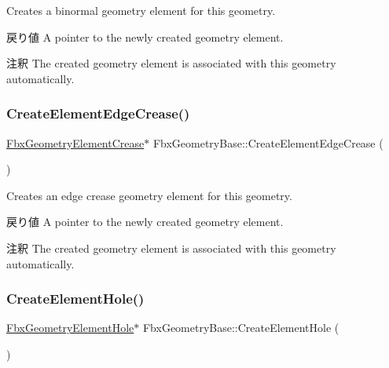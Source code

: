 Creates a binormal geometry element for this geometry. \begin{DoxyReturn}{戻り値}
A pointer to the newly created geometry element. 
\end{DoxyReturn}
\begin{DoxyRemark}{注釈}
The created geometry element is associated with this geometry automatically. 
\end{DoxyRemark}
\mbox{\label{class_fbx_geometry_base_ae5475b4e64c7fa7a9c3c1edd3365d53f}} 
\subsubsection{\texorpdfstring{Create\+Element\+Edge\+Crease()}{CreateElementEdgeCrease()}}
{\footnotesize\ttfamily \hyperlink{fbxlayer_8h_aa1db71d39153856548f192cf52aa2cc5}{Fbx\+Geometry\+Element\+Crease}$\ast$ Fbx\+Geometry\+Base\+::\+Create\+Element\+Edge\+Crease (\begin{DoxyParamCaption}{ }\end{DoxyParamCaption})}

Creates an edge crease geometry element for this geometry. \begin{DoxyReturn}{戻り値}
A pointer to the newly created geometry element. 
\end{DoxyReturn}
\begin{DoxyRemark}{注釈}
The created geometry element is associated with this geometry automatically. 
\end{DoxyRemark}
\mbox{\label{class_fbx_geometry_base_a2c30734fb6ff6bb93adadd35978fc146}} 
\subsubsection{\texorpdfstring{Create\+Element\+Hole()}{CreateElementHole()}}
{\footnotesize\ttfamily \hyperlink{fbxlayer_8h_ac66f768aa149c016447f88213c374e25}{Fbx\+Geometry\+Element\+Hole}$\ast$ Fbx\+Geometry\+Base\+::\+Create\+Element\+Hole (\begin{DoxyParamCaption}{ }\end{DoxyParamCaption})}

